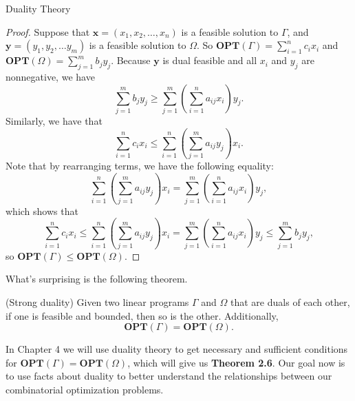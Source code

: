 \begin{section}{Duality Theory}
	\begin{proof}
		Suppose that $\mathbf{x} = (x_1, x_2,\dots,x_n)$ is a feasible solution to $\Gamma$, and 
		$\mathbf{y} = (y_1, y_2, \dots y_m)$ is a feasible solution to $\Omega$. 
		So $\mathbf{OPT}(\Gamma) = \sum_{i=1}^{n} c_i x_i$ and 
		$\mathbf{OPT}(\Omega) = \sum_{j=1}^{m} b_j y_j$.
		Because 
		$\mathbf{y}$ is dual feasible and all $x_i$ and $y_j$ are nonnegative, we have 
		\[
			\sum_{j=1}^{m} b_j y_j \geq \sum_{j=1}^{m}\left(\sum_{i=1}^{n} a_{ij}x_i\right) 
			y_j.
		\]
		Similarly, we have that 
		\[
			\sum_{i=1}^{n} c_i x_i \leq \sum_{i=1}^{n}\left(\sum_{j=1}^{m} a_{ij} y_j\right) 
			x_i.
		\]
		Note that by rearranging terms, we have the following equality:
		\[
			\sum_{i=1}^{n}\left(\sum_{j=1}^{m} a_{ij} y_j\right) 
			x_i =
			\sum_{j=1}^{m}\left(\sum_{i=1}^{n} a_{ij}x_i\right) 
			y_j,
		\]
		which shows that 
		\[
			\sum_{i=1}^{n} c_i x_i \leq 
			\sum_{i=1}^{n}\left(\sum_{j=1}^{m} a_{ij} y_j\right) 
			x_i =
			\sum_{j=1}^{m}\left(\sum_{i=1}^{n} a_{ij}x_i\right) 
			y_j \leq 
			\sum_{j=1}^{m} b_j y_j,
		\]
		so $\mathbf{OPT}(\Gamma) \leq \mathbf{OPT}(\Omega)$.
	\end{proof}
	What's surprising is the following theorem.

	\begin{theorem}{(Strong duality)}
		Given two linear programs $\Gamma$ and $\Omega$ that are duals of each other, if one is 
		feasible and bounded, then so is the other. Additionally, 
		\[
			\mathbf{OPT}(\Gamma) = \mathbf{OPT}(\Omega).
		\]
	\end{theorem} 
	In Chapter 4 we will use duality theory to get necessary and sufficient conditions for 
	$\mathbf{OPT}(\Gamma) = \mathbf{OPT}(\Omega)$, which will give us \textbf{Theorem 2.6}.
	Our goal now is to use facts about duality to better understand the relationships between 
	our combinatorial optimization problems.


\end{section}
